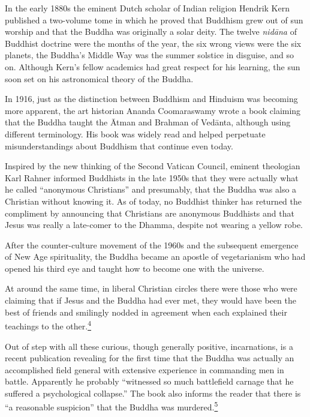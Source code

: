 In the early 1880s the eminent Dutch scholar of Indian religion Hendrik
Kern published a two-volume tome in which he proved that Buddhism grew
out of sun worship and that the Buddha was originally a solar deity. The
twelve \emph{nidāna} of Buddhist doctrine were the months of the year,
the six wrong views were the six planets, the Buddha's Middle Way was
the summer solstice in disguise, and so on. Although Kern's fellow
academics had great respect for his learning, the sun soon set on his
astronomical theory of the Buddha.

In 1916, just as the distinction between Buddhism and Hinduism was
becoming more apparent, the art historian Ananda Coomaraswamy wrote a
book claiming that the Buddha taught the Ātman and Brahman of Vedānta,
although using different terminology. His book was widely read and
helped perpetuate misunderstandings about Buddhism that continue even
today.

Inspired by the new thinking of the Second Vatican Council, eminent
theologian Karl Rahner informed Buddhists in the late 1950s that they
were actually what he called ``anonymous Christians'' and presumably,
that the Buddha was also a Christian without knowing it. As of today, no
Buddhist thinker has returned the compliment by announcing that
Christians are anonymous Buddhists and that Jesus was really a
late-comer to the Dhamma, despite not wearing a yellow robe.

After the counter-culture movement of the 1960s and the subsequent
emergence of New Age spirituality, the Buddha became an apostle of
vegetarianism who had opened his third eye and taught how to become one
with the universe.

At around the same time, in liberal Christian circles there were those
who were claiming that if Jesus and the Buddha had ever met, they would
have been the best of friends and smilingly nodded in agreement when
each explained their teachings to the
other.\label{footprints_split_005.html_fnref4}\hyperref[footprints_split_024.htmlux5cux23fn4]{\textsuperscript{4}}

Out of step with all these curious, though generally positive,
incarnations, is a recent publication revealing for the first time that
the Buddha was actually an accomplished field general with extensive
experience in commanding men in battle. Apparently he probably
``witnessed so much battlefield carnage that he suffered a psychological
collapse.'' The book also informs the reader that there is ``a
reasonable suspicion'' that the Buddha was
murdered.\label{footprints_split_005.html_fnref5}\hyperref[footprints_split_024.htmlux5cux23fn5]{\textsuperscript{5}}

